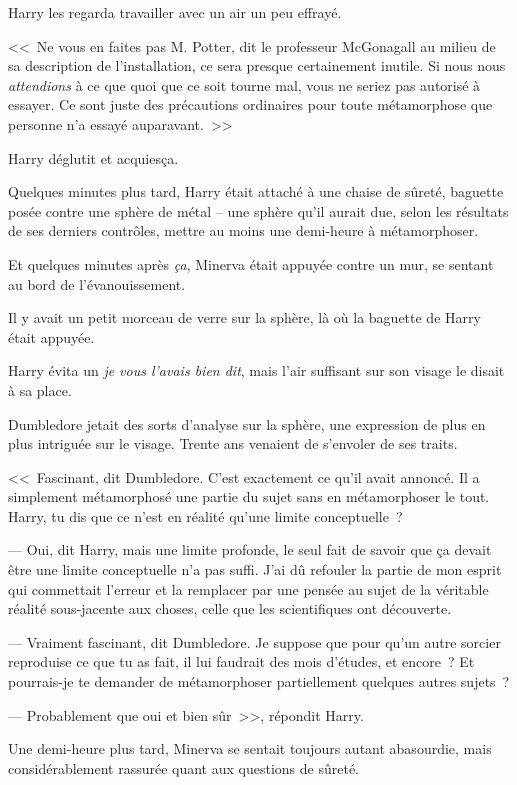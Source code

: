 Harry les regarda travailler avec un air un peu effrayé.

<<~Ne vous en faites pas M. Potter, dit le professeur McGonagall au milieu de sa description de l'installation, ce sera presque certainement inutile. Si nous nous \emph{attendions} à ce que quoi que ce soit tourne mal, vous ne seriez pas autorisé à essayer. Ce sont juste des précautions ordinaires pour toute métamorphose que personne n'a essayé auparavant.~>>

Harry déglutit et acquiesça.

Quelques minutes plus tard, Harry était attaché à une chaise de sûreté, baguette posée contre une sphère de métal -- une sphère qu'il aurait due, selon les résultats de ses derniers contrôles, mettre au moins une demi-heure à métamorphoser.

Et quelques minutes après \emph{ça}, Minerva était appuyée contre un mur, se sentant au bord de l'évanouissement.

Il y avait un petit morceau de verre sur la sphère, là où la baguette de Harry était appuyée.

Harry évita un \emph{je vous l'avais bien dit}, mais l'air suffisant sur son visage le disait à sa place.

Dumbledore jetait des sorts d'analyse sur la sphère, une expression de plus en plus intriguée sur le visage. Trente ans venaient de s'envoler de ses traits.

<<~Fascinant, dit Dumbledore. C'est exactement ce qu'il avait annoncé. Il a simplement métamorphosé une partie du sujet sans en métamorphoser le tout. Harry, tu dis que ce n'est en réalité qu'une limite conceptuelle~?

--- Oui, dit Harry, mais une limite profonde, le seul fait de savoir que ça devait être une limite conceptuelle n'a pas suffi. J'ai dû refouler la partie de mon esprit qui commettait l'erreur et la remplacer par une pensée au sujet de la véritable réalité sous-jacente aux choses, celle que les scientifiques ont découverte.

--- Vraiment fascinant, dit Dumbledore. Je suppose que pour qu'un autre sorcier reproduise ce que tu as fait, il lui faudrait des mois d'études, et encore~? Et pourrais-je te demander de métamorphoser partiellement quelques autres sujets~?

--- Probablement que oui et bien sûr~>>, répondit Harry.

Une demi-heure plus tard, Minerva se sentait toujours autant abasourdie, mais considérablement rassurée quant aux questions de sûreté.

